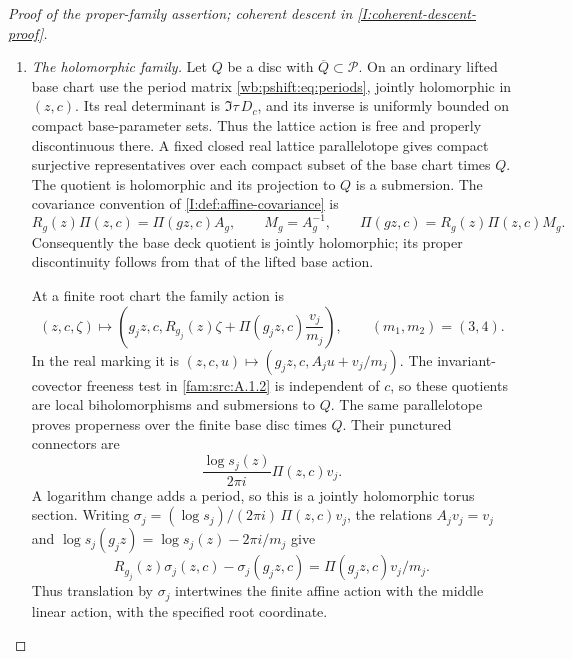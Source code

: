 \begin{proof}[Proof of the proper-family assertion; coherent descent in \cref{I:coherent-descent-proof}]
\begin{enumerate}[label=\arabic*.,leftmargin=*]
\item \emph{The holomorphic family.}
Let $Q$ be a disc with $\overline Q\subset\mathcal P$.
On an ordinary lifted base chart use the period matrix
\eqref{wb:pshift:eq:periods}, jointly holomorphic in $(z,c)$.
Its real determinant is $\Im\tau\,D_c$, and its inverse is
uniformly bounded on compact base-parameter sets. Thus the lattice
action is free and properly discontinuous there. A fixed closed
real lattice parallelotope gives compact surjective representatives
over each compact subset of the base chart times $Q$.
The quotient is holomorphic and its projection to $Q$ is a submersion.
The covariance convention of \cref{I:def:affine-covariance} is
\[
 R_g(z)\Pi(z,c)=\Pi(gz,c)A_g,
 \qquad M_g=A_g^{-1},\qquad
 \Pi(gz,c)=R_g(z)\Pi(z,c)M_g.
\]
Consequently the base deck quotient is jointly holomorphic; its
proper discontinuity follows from that of the lifted base action.

At a finite root chart the family action is
\begin{equation}
 (z,c,\zeta)\longmapsto
 \left(g_jz,c,R_{g_j}(z)\zeta+
             \Pi(g_jz,c)\frac{v_j}{m_j}\right),
 \qquad (m_1,m_2)=(3,4).
\label{pub:I:eq:PD7}
\end{equation}
In the real marking it is $(z,c,u)\mapsto(g_jz,c,A_ju+v_j/m_j)$.
The invariant-covector freeness test in \cref{fam:src:A.1.2}
is independent of $c$, so these quotients are local biholomorphisms
and submersions to $Q$. The same parallelotope proves properness
over the finite base disc times $Q$. Their punctured connectors are
\begin{equation}
 \frac{\log s_j(z)}{2\pi i}\Pi(z,c)v_j.
\label{pub:I:eq:PD8}
\end{equation}
A logarithm change adds a period, so this is a jointly holomorphic
torus section. Writing $\sigma_j=(\log s_j)/(2\pi i)\,\Pi(z,c)v_j$, the
relations $A_jv_j=v_j$ and
$\log s_j(g_jz)=\log s_j(z)-2\pi i/m_j$ give
\[
 R_{g_j}(z)\sigma_j(z,c)-\sigma_j(g_jz,c)
       =\Pi(g_jz,c)v_j/m_j.
\]
Thus translation by $\sigma_j$ intertwines the finite affine action
with the middle linear action, with the specified root coordinate.


\end{enumerate}
\end{proof}

